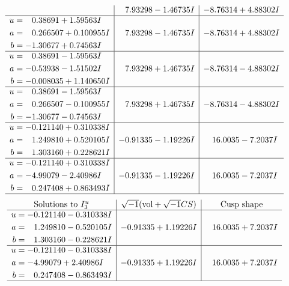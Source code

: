 \documentclass[1p]{elsarticle_modified}
\theoremstyle{definition}
\newcommand{\I}{\sqrt{-1}}
\begin{document}
$$\begin{array}{c|c|c}
 & \phantom{-}7.93298 - 1.46735 I & -8.76314 + 4.88302 I \\ \hline\begin{aligned}
u &= \phantom{-}0.38691 + 1.59563 I \\
a &= \phantom{-}0.266507 + 0.100955 I \\
b &= -1.30677 + 0.74563 I\end{aligned}
 & \phantom{-}7.93298 - 1.46735 I & -8.76314 + 4.88302 I \\ \hline\begin{aligned}
u &= \phantom{-}0.38691 - 1.59563 I \\
a &= -0.53938 - 1.51502 I \\
b &= -0.008035 + 1.140650 I\end{aligned}
 & \phantom{-}7.93298 + 1.46735 I & -8.76314 - 4.88302 I \\ \hline\begin{aligned}
u &= \phantom{-}0.38691 - 1.59563 I \\
a &= \phantom{-}0.266507 - 0.100955 I \\
b &= -1.30677 - 0.74563 I\end{aligned}
 & \phantom{-}7.93298 + 1.46735 I & -8.76314 - 4.88302 I \\ \hline\begin{aligned}
u &= -0.121140 + 0.310338 I \\
a &= \phantom{-}1.249810 + 0.520105 I \\
b &= \phantom{-}1.303160 + 0.228621 I\end{aligned}
 & -0.91335 - 1.19226 I & \phantom{-}16.0035 - 7.2037 I \\ \hline\begin{aligned}
u &= -0.121140 + 0.310338 I \\
a &= -4.99079 - 2.40986 I \\
b &= \phantom{-}0.247408 + 0.863493 I\end{aligned}
 & -0.91335 - 1.19226 I & \phantom{-}16.0035 - 7.2037 I\\
 \hline 
 \end{array}$$\newpage$$\begin{array}{c|c|c}  
\text{Solutions to }I^u_{3}& \I (\text{vol} + \sqrt{-1}CS) & \text{Cusp shape}\\
 \hline 
\begin{aligned}
u &= -0.121140 - 0.310338 I \\
a &= \phantom{-}1.249810 - 0.520105 I \\
b &= \phantom{-}1.303160 - 0.228621 I\end{aligned}
 & -0.91335 + 1.19226 I & \phantom{-}16.0035 + 7.2037 I \\ \hline\begin{aligned}
u &= -0.121140 - 0.310338 I \\
a &= -4.99079 + 2.40986 I \\
b &= \phantom{-}0.247408 - 0.863493 I\end{aligned}
 & -0.91335 + 1.19226 I & \phantom{-}16.0035 + 7.2037 I\\
 \hline 
 \end{array}$$\newpage\newpage\renewcommand{\arraystretch}{1}
\end{document}
